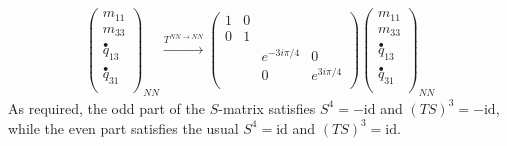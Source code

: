 \begin{align}
\left( \begin{matrix}
m_{11}\\
m_{33}\\
\stackrel{\bullet}{q}_{13}\\
\stackrel{\bullet}{q}_{31}\\
\end{matrix} \right)_{NN}
\xrightarrow{T^{NN \rightarrow NN}}
 \left( \begin{matrix}
1&0&&\\
0&1&&\\
&&e^{-3i\pi/4}&0\\
&&0&e^{3i \pi /4}\\ 
\end{matrix} \right)
\left( \begin{matrix}
m_{11}\\
m_{33}\\
\stackrel{\bullet}{q}_{13}\\
\stackrel{\bullet}{q}_{31}\\
\end{matrix} \right)_{NN}
\end{align}
As required, the odd part of the $S$-matrix satisfies $S^4 = -\text{id}$ and $(TS)^3 = -\text{id}$, 
while the even part satisfies the usual $S^4 = \text{id}$ and $(TS)^3 = \text{id}$. 
